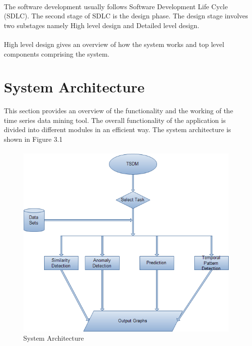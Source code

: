 \documentclass[12pt,a4paper]{report}
\begin{document}
\paragraph{}The software development usually follows Software Development Life Cycle (SDLC). The second stage of SDLC is the design phase. The design stage involves two substages namely High level design and Detailed level design.\\
\paragraph{} High level design gives an overview of how the system works and top level components comprising the system.

\section{System Architecture}
\paragraph{}This section provides an overview of  the functionality and the working of the time series data mining tool. The overall functionality of the application is divided into different modules in an efficient way. The system architecture is shown in Figure 3.1
\paragraph{}

\begin{figure}[h!]
	\centering
		\includegraphics[scale=0.7]{system-architecture.png}
		\caption{ System Architecture}
\end{figure} 
\end{document}
